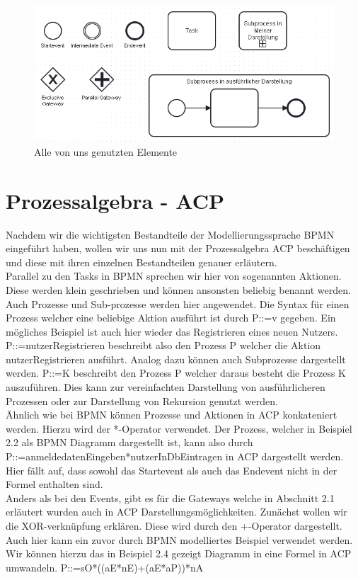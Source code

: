 \begin{figure}
\centering
\includegraphics[scale=0.5]{Figures/Alleblocke}
\decoRule
\caption[Alle Elemente]{Alle von uns genutzten Elemente}
\label{fig:Task}
\end{figure}
\section {Prozessalgebra - ACP}
Nachdem wir die wichtigsten Bestandteile der Modellierungssprache BPMN eingeführt haben, wollen wir uns nun mit der Prozessalgebra ACP beschäftigen und diese mit ihren einzelnen Bestandteilen genauer erläutern.\\
Parallel zu den Tasks in BPMN sprechen wir hier von sogenannten Aktionen. Diese werden klein geschrieben und können ansonsten beliebig benannt werden. Auch Prozesse und Sub-prozesse werden hier angewendet. Die Syntax für einen Prozess welcher eine beliebige Aktion ausführt ist durch P::=v gegeben. Ein mögliches Beispiel ist auch hier wieder das Registrieren eines neuen Nutzers. P::=nutzerRegistrieren beschreibt also den Prozess P welcher die Aktion nutzerRegistrieren ausführt. Analog dazu können auch Subprozesse dargestellt werden. P::=K beschreibt den Prozess P welcher daraus besteht die Prozess K auszuführen. Dies kann zur vereinfachten Darstellung von ausführlicheren Prozessen oder zur Darstellung von Rekursion genutzt werden.\\
Ähnlich wie bei BPMN können Prozesse und Aktionen in ACP konkateniert werden. Hierzu wird der *-Operator verwendet. Der Prozess, welcher in Beispiel 2.2 als BPMN Diagramm dargestellt ist, kann also durch P::=anmeldedatenEingeben*nutzerInDbEintragen in ACP dargestellt werden. Hier fällt auf, dass sowohl das Startevent als auch das Endevent nicht in der Formel enthalten sind.\\
Anders als bei den Events, gibt es für die Gateways welche in Abschnitt 2.1 erläutert wurden auch in ACP Darstellungsmöglichkeiten. Zunächst wollen wir die XOR-verknüpfung erklären. Diese wird durch den +-Operator dargestellt. Auch hier kann ein zuvor durch BPMN modelliertes Beispiel verwendet werden. Wir können hierzu das in Beispiel 2.4 gezeigt Diagramm in eine Formel in ACP umwandeln. P::=sO*((aE*nE)+(aE*aP))*nA\\
